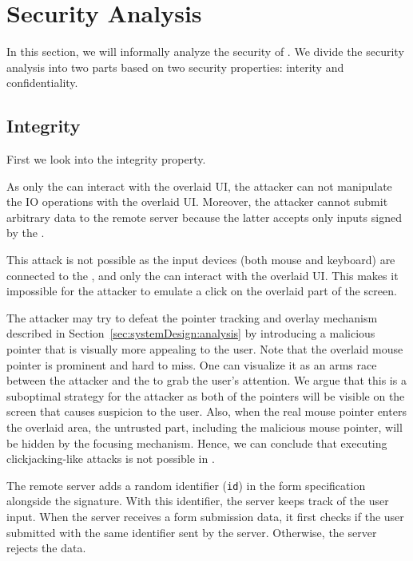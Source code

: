 \section{Security Analysis}
\label{sec:securityAnalysis_protection}

In this section, we will informally analyze the security of \name. We divide the security analysis into two parts based on two security properties: interity and confidentiality.

\subsection{Integrity}
\label{sec:securityAnalysis:integrity}

First we look into the integrity property.

 As only the \device can interact with the overlaid UI, the attacker can not manipulate the IO operations with the overlaid UI. Moreover, the attacker cannot submit arbitrary data to the remote server because the latter accepts only inputs signed by the \device.


 This attack is not possible as the input devices (both mouse and keyboard) are connected to the \device, and only the \device can interact with the overlaid UI. This makes it impossible for the attacker to emulate a click on the overlaid part of the screen.  


The attacker may try to defeat the \name pointer tracking and overlay mechanism described in Section~\ref{sec:systemDesign:analysis} by introducing a malicious pointer that is visually more appealing to the user. Note that the \device overlaid mouse pointer is prominent and hard to miss. One can visualize it as an arms race between the attacker and the \device to grab the user's attention. We argue that this is a suboptimal strategy for the attacker as both of the pointers will be visible on the screen that causes suspicion to the user. Also, when the real mouse pointer enters the overlaid area, the untrusted part, including the malicious mouse pointer, will be hidden by the focusing mechanism. Hence, we can conclude that executing clickjacking-like attacks is not possible in \name.


 The remote server adds a random identifier (\texttt{id}) in the form specification alongside the signature. With this identifier, the server keeps track of the user input. When the server receives a form submission data, it first checks if the user submitted with the same identifier sent by the server. Otherwise, the server rejects the data. 


